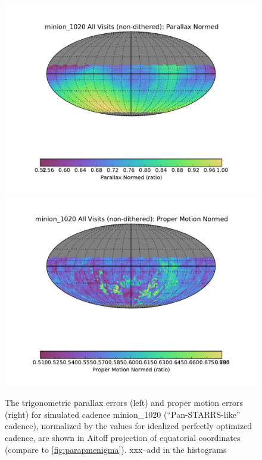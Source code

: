 \begin{figure}[t!]
\vskip -0.03in
\includegraphics[angle=0,width=0.49\hsize:,clip]{figs/cadence/minion_1020_Parallax_Normed_All_Visits_non-dithered_HEAL_SkyMap.pdf}
\includegraphics[angle=0,width=0.49\hsize:,clip]{figs/cadence/minion_1020_Proper_Motion_Normed_All_Visits_non-dithered_HEAL_SkyMap.pdf}
\vskip -0.2in
\caption{The trigonometric parallax errors (left) and proper motion errors (right)  for simulated cadence
minion\_1020 (``Pan-STARRS-like'' cadence), normalized by the values for idealized perfectly optimized
cadence, are shown in Aitoff projection of equatorial coordinates (compare to \autoref{fig:parapmenigma}). xxx--add in the histograms}
\label{fig:parapmenigma2}
\end{figure}

